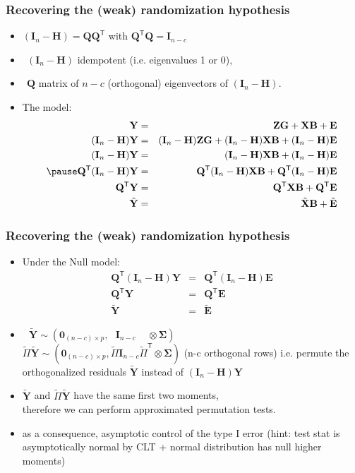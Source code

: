 \documentclass[xcolor={pdftex,dvipsnames,table}]{beamer}
\newcommand{\bb}[1]{\begin{block}{#1}}
\newcommand{\eb}{\end{block}}
\newcommand{\bi}{\begin {itemize}}
\newcommand{\ei}{\end{itemize}}
\newcommand{\Perm}{\Pi}
\newcommand{\IH}{(\mathbf{I}_n-\mathbf{H})}
\begin{document}
\begin{frame}
\frametitle{Recovering the (weak) randomization hypothesis}


\bb{}
\bi
\item  $\IH = \mathbf{Q}\mathbf{Q}^\mathsf{T}$ with $\mathbf{Q}^\mathsf{T}\mathbf{Q}=\mathbf{I}_{n-c}$\\
\item[] $\ \ \IH$ idempotent (i.e. eigenvalues 1 or 0),  
\item[] $\ \ \mathbf{Q}$ matrix of $n-c$ (orthogonal) eigenvectors of $\IH$.
\pause
\item The model: \begin{eqnarray*}
\nonumber \mathbf{Y} &=& \mathbf{Z}\mathbf{G} + \mathbf{X}\mathbf{B} + \mathbf{E}  \\
\nonumber \IH\mathbf{Y} &=& \IH\mathbf{Z}\mathbf{G}  + \IH\mathbf{X}\mathbf{B}  + \IH\mathbf{E}  \\
\nonumber \IH\mathbf{Y} &=& \IH\mathbf{X}\mathbf{B}  + \IH\mathbf{E}  \\
\pause
\nonumber \mathbf{Q}^\mathsf{T}\IH\mathbf{Y} &=& \mathbf{Q}^\mathsf{T}\IH\mathbf{X}\mathbf{B}  +\mathbf{Q}^\mathsf{T}  \IH\mathbf{E}  \\
\nonumber   \mathbf{Q}^\mathsf{T}\mathbf{Y} &=&  \mathbf{Q}^\mathsf{T}\mathbf{X}\mathbf{B} + \mathbf{Q}^\mathsf{T}\mathbf{E} \\
  \tilde{\mathbf{Y}} &=& \tilde{\mathbf{X}}\mathbf{B} +\tilde{\mathbf{E}}
\end{eqnarray*}
\ei
\eb
\end{frame}
\begin{frame}
\frametitle{Recovering the (weak) randomization hypothesis}
\bb{}
\bi
\item Under the \textcolor{redUnipd}{Null model}: 
\begin{eqnarray*}
\nonumber \mathbf{Q}^\mathsf{T}\IH\mathbf{Y} &=& \mathbf{Q}^\mathsf{T}  \IH\mathbf{E}  \\
\nonumber   \mathbf{Q}^\mathsf{T}\mathbf{Y} &=& \mathbf{Q}^\mathsf{T}\mathbf{E} \\
  \tilde{\mathbf{Y}} &=& \tilde{\mathbf{E}}
\end{eqnarray*}

\item $\,\,\,\,\tilde{\mathbf{Y}} \sim (\mathbf{0}_{(n-c)\times p}, \,\,\,\, \mathbf{I}_{n-c} \,\,\,\,\,\,\, \otimes \mathbf{\Sigma} )$\\ 
$\tilde{\Perm}\tilde{\mathbf{Y}} \sim (\mathbf{0}_{(n-c)\times p}, \tilde{\Perm}\mathbf{I}_{n-c} \tilde{\Perm}^\mathsf{T} \otimes \mathbf{\Sigma} )$
(\textcolor{redUnipd}{n-c orthogonal} rows)
i.e. permute the orthogonalized residuals $\tilde{\mathbf{Y}}$ instead of  $\IH\mathbf{Y}$
\item $\tilde{\mathbf{Y}}$ and $\tilde{\Perm}\tilde{\mathbf{Y}}$ have the \textcolor{redUnipd}{same first two moments},\\ 
therefore we can perform approximated permutation tests.
\item as a consequence, \textcolor{redUnipd}{asymptotic control of the type I error} (hint: test stat is asymptotically normal by CLT + normal distribution has null higher moments)
\ei
\eb
\end{frame}
\end{document}
